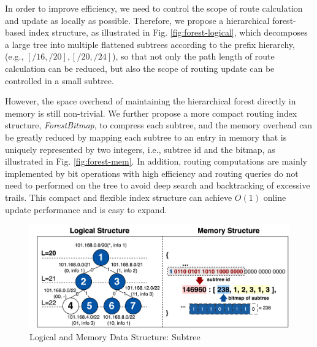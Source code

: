 





In order to improve efficiency, we need to control the scope of route calculation and update as locally as possible. Therefore, we propose a hierarchical forest-based index structure, as illustrated in Fig. \ref{fig:forest-logical}, which decomposes a large tree into multiple flattened subtrees according to the prefix hierarchy, (e.g., $[/16, /20], [/20, /24]$), so that not only the path length of route calculation can be reduced, but also the scope of routing update can be controlled in a small subtree. 

However, the space overhead of maintaining the hierarchical forest directly in memory is still non-trivial. We further propose a more compact routing index structure, \emph{ForestBitmap}, to compress each subtree, and the memory overhead can be greatly reduced by mapping each subtree to an entry in memory that is uniquely represented by two integers, i.e., subtree id and the bitmap, as illustrated in Fig. \ref{fig:forest-mem}. In addition, routing computations are mainly implemented by bit operations with high efficiency and routing queries do not need to performed on the tree to avoid deep search and backtracking of excessive trails. This compact and flexible index structure can achieve $O(1)$ online update performance and is easy to expand.

\begin{figure}
	\centering
	\includegraphics[width=\linewidth]{figs/nsdi-tree.png}
	\caption{\small Logical and Memory Data Structure: Subtree}
	\label{fig:treestructure}
\end{figure}


